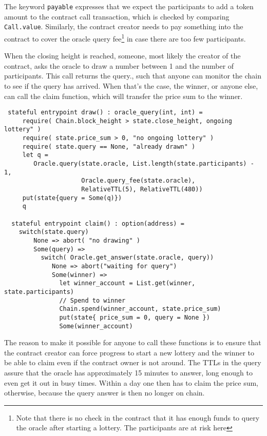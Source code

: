 The keyword \verb+payable+ expresses that we expect the participants
to add a token amount to the contract call transaction, which is
checked by comparing \verb+Call.value+. Similarly, the contract
creator needs to pay something into the contract to cover the oracle query
fee\footnote{Note that there is no check in the contract that it has
  enough funds to query the oracle after starting a lottery. The
  participants are at risk here} in case there are too few
participants.

When the closing height is reached, someone, most likely the creator
of the contract, asks the oracle to draw a number between 1 and the
number of participants. This call returns the query., such that anyone
can monitor the chain to see if the query has arrived. When that's the
case, the winner, or anyone else, can call the claim function, which
will transfer the price sum to the winner.
\begin{verbatim}
 stateful entrypoint draw() : oracle_query(int, int) =
     require( Chain.block_height > state.close_height, ongoing lottery" )
     require( state.price_sum > 0, "no ongoing lottery" )
     require( state.query == None, "already drawn" )
     let q =
        Oracle.query(state.oracle, List.length(state.participants) - 1,
                     Oracle.query_fee(state.oracle),
                     RelativeTTL(5), RelativeTTL(480))
     put(state{query = Some(q)})
     q

  stateful entrypoint claim() : option(address) =
    switch(state.query)
        None => abort( "no drawing" )
        Some(query) =>
          switch( Oracle.get_answer(state.oracle, query))
             None => abort("waiting for query")
             Some(winner) =>
               let winner_account = List.get(winner, state.participants)
               // Spend to winner
               Chain.spend(winner_account, state.price_sum)
               put(state{ price_sum = 0, query = None })
               Some(winner_account)
\end{verbatim}

The reason to make it possible for anyone to call these functions is
to ensure that the contract creator can force progress to start a new
lottery and the winner to be able to claim even if the contract owner
is not around. The TTLs in the query assure that the oracle has
approximately 15 minutes to answer, long enough to even get it out
in busy times. Within a day one then has to claim the price sum,
otherwise, because the query answer is then no longer on chain.


